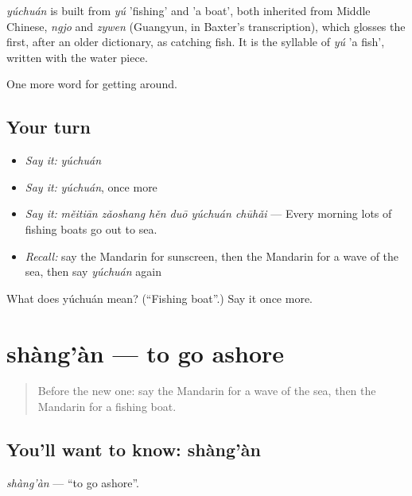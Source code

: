 \begin{cousinweb}
\emph{yúchuán} is built from \emph{yú} 'fishing' and  'a boat', both inherited from Middle Chinese, \emph{ngjo} and \emph{zywen} (Guangyun, in Baxter's transcription), which glosses the first, after an older dictionary, as catching fish. It is the syllable of \emph{yú} 'a fish', written with the water piece.
\end{cousinweb}

\begin{grammarlens}[title={What you've built}]
One more word for getting around.
\end{grammarlens}

\subsection*{Your turn}
\begin{itemize}
\raggedright
  \item \emph{Say it:} \emph{yúchuán}
  \item \emph{Say it:} \emph{yúchuán}, once more
  \item \emph{Say it:} \emph{měitiān zǎoshang hěn duō yúchuán chūhǎi} — Every morning lots of fishing boats go out to sea.
  \item \emph{Recall:} say the Mandarin for sunscreen, then the Mandarin for a wave of the sea, then say \emph{yúchuán} again
\end{itemize}

\begin{tcolorbox}[breakable,colback=teal!4,colframe=teal!35!black,title={Before you move on}]
What does yúchuán mean? (\textquotedblleft{}Fishing boat\textquotedblright{}.) Say it once more.
\end{tcolorbox}
\section[shàng'àn]{shàng'àn — to go ashore}

\label{lesson:ZH-C445-shangan}



\begin{quote}
Before the new one: say the Mandarin for a wave of the sea, then the Mandarin for a fishing boat.
\end{quote}

\subsection*{You'll want to know: shàng'àn}
\emph{shàng'àn} — \textquotedblleft{}to go ashore\textquotedblright{}.


